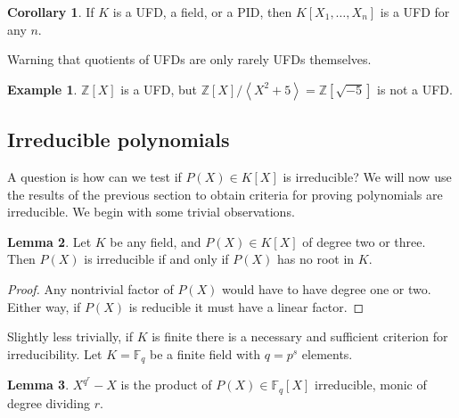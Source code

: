 \documentclass{article}
\newcommand{\F}{\mathbb{F}}
\newcommand{\Z}{\mathbb{Z}}
\newcommand{\rb}[1]{\left( #1 \right)}
\renewcommand{\sb}[1]{\left[ #1 \right]}
\newcommand{\ab}[1]{\left\langle #1 \right\rangle}
\theoremstyle{definition}\newtheorem{definition}{Definition}[subsection]
\theoremstyle{definition}\newtheorem{remark}[definition]{Remark}
\theoremstyle{definition}\newtheorem*{example}{Example}
\theoremstyle{definition}\newtheorem*{note}{Note}
\newtheorem{lemma}[definition]{Lemma}
\newtheorem{corollary}[definition]{Corollary}
\begin{document}
\begin{corollary}
If $ K $ is a UFD, a field, or a PID, then $ K\sb{X_1, \dots, X_n} $ is a UFD for any $ n $.
\end{corollary}

Warning that quotients of UFDs are only rarely UFDs themselves.

\begin{example}
$ \Z\sb{X} $ is a UFD, but $ \Z\sb{X} / \ab{X^2 + 5} = \Z\sb{\sqrt{-5}} $ is not a UFD.
\end{example}


\subsection{Irreducible polynomials}

A question is how can we test if $ P\rb{X} \in K\sb{X} $ is irreducible? We will now use the results of the previous section to obtain criteria for proving polynomials are irreducible. We begin with some trivial observations.

\begin{lemma}
Let $ K $ be any field, and $ P\rb{X} \in K\sb{X} $ of degree two or three. Then $ P\rb{X} $ is irreducible if and only if $ P\rb{X} $ has no root in $ K $.
\end{lemma}

\begin{proof}
Any nontrivial factor of $ P\rb{X} $ would have to have degree one or two. Either way, if $ P\rb{X} $ is reducible it must have a linear factor.
\end{proof}

Slightly less trivially, if $ K $ is finite there is a necessary and sufficient
criterion for irreducibility. Let $ K = \F_q $ be a finite field with $ q = p^s $ elements.

\begin{lemma}
$ X^{q^r} - X $ is the product of $ P\rb{X} \in \F_q\sb{X} $ irreducible, monic of degree dividing $ r $.
\end{lemma}
\end{document}
